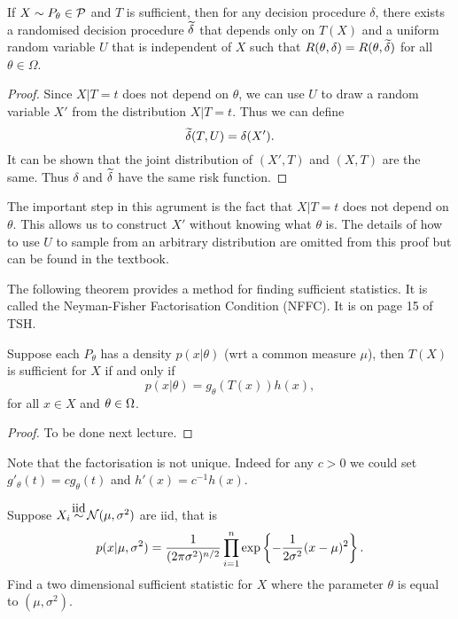 \begin{thrm}
    If $X \sim P_\theta \in {\mathcal{P}}$ and $T$ is sufficient, then for any decision procedure $\delta$, there exists a randomised decision procedure $\widetilde{\delta}$ that depends only on $T(X)$ and a uniform random variable $U$ that is independent of $X$ such that $R(\theta, \delta) = R(\theta, \widetilde{\delta})$ for all $\theta \in \Omega$.
\end{thrm}

\begin{proof}
    Since $X| T=t$ does not depend on $\theta$, we can use $U$ to draw a random variable $X'$ from the distribution $X | T = t$. Thus we can define
    \[\widetilde{\delta}(T,U) = \delta(X'). \]
    It can be shown that the joint distribution of $(X',T)$ and $(X,T)$ are the same. Thus $\delta$ and $\widetilde{\delta}$ have the same risk function.
\end{proof}
The important step in this agrument is the fact that $X | T=t$ does not depend on $\theta$. This allows us to construct $X'$ without knowing what $\theta$ is. The details of how to use $U$ to sample from an arbitrary distribution are omitted from this proof but can be found in the textbook.

The following theorem provides a method for finding sufficient statistics. It is called the Neyman-Fisher Factorisation Condition (NFFC). It is on page 15 of TSH.

\begin{thrm}
    Suppose each $P_\theta$ has a density $p(x| \theta)$ (wrt a common measure $\mu$), then $T(X)$ is sufficient for $X$ if and only if
    \[p(x| \theta) = g_\theta(T(x))h(x), \]
    for all $x \in X$ and $\theta \in {{\Omega}}$.
\end{thrm}
\begin{proof}
    To be done next lecture.
\end{proof}
Note that the factorisation is not unique. Indeed for any $c > 0$ we could set $g'_\theta(t) = cg_\theta(t)$ and $h'(x) = c^{-1}h(x)$.
\begin{exer}
Suppose $X_i \iid \Na(\mu, \sigma^2)$ are iid, that is 
\[p(x| \mu, \sigma^2) = \frac{1}{(2\pi \sigma^2)^{n/2}}\prod_{i=1}^n\exp\left\{-\frac{1}{2\sigma^2}(x-\mu)^2\right\}. \]
Find a two dimensional sufficient statistic for $X$ where the parameter $\theta$ is equal to $(\mu, \sigma^2)$.
\end{exer}
